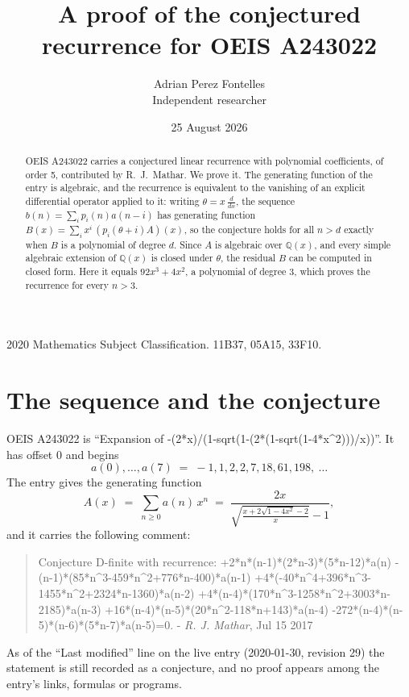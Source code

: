\documentclass[11pt,a4paper]{article}
\title{A proof of the conjectured recurrence for OEIS A243022}
\author{Adrian Perez Fontelles\\ \small Independent researcher}
\date{25 August 2026}
\theoremstyle{plain}
\theoremstyle{definition}
\begin{document}
\maketitle

\begin{abstract}
OEIS A243022 carries a conjectured linear recurrence with polynomial coefficients, of
order 5, contributed by R.~J.~Mathar. We prove it. The generating function of the
entry is algebraic, and the recurrence is equivalent to the vanishing of an explicit
differential operator applied to it: writing $\theta=x\,\frac{d}{dx}$, the sequence
$b(n)=\sum_{i}p_{i}(n)a(n-i)$ has generating function
$B(x)=\sum_{i}x^{i}\,(p_{i}(\theta+i)A)(x)$, so the conjecture holds for all $n>d$ exactly
when $B$ is a polynomial of degree $d$. Since $A$ is algebraic over $\mathbb{Q}(x)$, and every simple
algebraic extension of $\mathbb{Q}(x)$ is closed under $\theta$, the residual $B$ can be
computed in closed form. Here it equals $92 x^{3} + 4 x^{2}$, a polynomial of degree $3$, which proves
the recurrence for every $n>3$.
\end{abstract}

\noindent\small 2020 Mathematics Subject Classification. 11B37, 05A15, 33F10.\normalsize

\section{The sequence and the conjecture}

OEIS A243022 is ``Expansion of -(2*x)/(1-sqrt(1-(2*(1-sqrt(1-4*x\^{}2)))/x))''. It has offset $0$ and begins
\[
a(0),\dots,a(7)\;=\;-1, 1, 2, 2, 7, 18, 61, 198,\ \dots
\]
The entry gives the generating function
\begin{equation}\label{eq:gf}
A(x)\;=\;\sum_{n\ge 0} a(n)\,x^{n}\;=\;\frac{2 x}{\sqrt{\frac{x + 2 \sqrt{1 - 4 x^{2}} - 2}{x}} - 1} ,
\end{equation}
and it carries the following comment:
\begin{quote}\small
Conjecture D-finite with recurrence: +2*n*(n-1)*(2*n-3)*(5*n-12)*a(n) -(n-1)*(85*n\^{}3-459*n\^{}2+776*n-400)*a(n-1) +4*(-40*n\^{}4+396*n\^{}3-1455*n\^{}2+2324*n-1360)*a(n-2) +4*(n-4)*(170*n\^{}3-1258*n\^{}2+3003*n-2185)*a(n-3) +16*(n-4)*(n-5)*(20*n\^{}2-118*n+143)*a(n-4) -272*(n-4)*(n-5)*(n-6)*(5*n-7)*a(n-5)=0. - \emph{R. J. Mathar}, Jul 15 2017
\end{quote}
As of the ``Last modified'' line on the live entry (2020-01-30, revision 29) the
statement is still recorded as a conjecture, and no proof appears among the entry's links,
formulas or programs.
\end{document}
